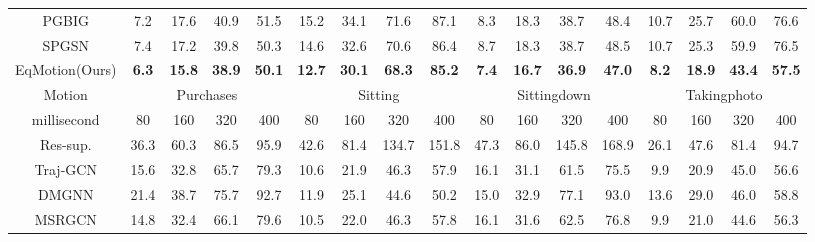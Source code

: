 \documentclass[10pt,twocolumn,letterpaper]{article}
\begin{document}
\begin{table*}[t]
{\begin{tabular}{c|cccc|cccc|cccc|cccc}
PGBIG                &   {7.2}  &   {17.6} &   {40.9} &   {51.5} &   {15.2} &   {34.1} &   {71.6} &   {87.1} &   {8.3}  &   {18.3} &   {38.7} &   {48.4} &   {10.7} &   {25.7} &   {60.0} &   {76.6} \\ 
SPGSN               & 7.4          & 17.2          & 39.8          & 50.3          & 14.6         & 32.6          & {70.6}         & {86.4}         & 8.7 &18.3& 38.7& 48.5        & 10.7& 25.3& 59.9& 76.5               \\ 
EqMotion(Ours) & \textbf{6.3}&\textbf{15.8}&\textbf{38.9}&\textbf{50.1}&\textbf{12.7}&\textbf{30.1}&\textbf{68.3}&\textbf{85.2}&\textbf{7.4}&\textbf{16.7}&\textbf{36.9}&\textbf{47.0}&\textbf{8.2}&\textbf{18.9}&\textbf{43.4}&\textbf{57.5} \\ \hline
Motion           & \multicolumn{4}{c|}{Purchases}                                 & \multicolumn{4}{c|}{Sitting}                                   & \multicolumn{4}{c|}{Sittingdown}                               & \multicolumn{4}{c}{Takingphoto}                               \\ \hline
millisecond        & 80           & 160          & 320          & 400          & 80           & 160          & 320          & 400          & 80           & 160          & 320          & 400          & 80           & 160          & 320          & 400          \\ \hline
Res-sup.          & 36.3          & 60.3          & 86.5          & 95.9          & 42.6          & 81.4          & 134.7         & 151.8         & 47.3          & 86.0          & 145.8         & 168.9         & 26.1          & 47.6          & 81.4          & 94.7          \\
Traj-GCN                & 15.6          & 32.8          & 65.7          &  79.3          & 10.6          &  21.9          & 46.3          & 57.9          & 16.1          &  31.1          &  61.5          &  75.5          & 9.9           &  20.9          & 45.0          & 56.6          \\
DMGNN              & 21.4          & 38.7          & 75.7          & 92.7          & 11.9          & 25.1          & 44.6          &   {50.2}          & 15.0          & 32.9          & 77.1          & 93.0          & 13.6          & 29.0          & 46.0          & 58.8          \\
MSRGCN                &  14.8          &  32.4          & 66.1          & 79.6          &  10.5          & 22.0          &  46.3          & 57.8          &  16.1          & 31.6          & 62.5          & 76.8          &  9.9           & 21.0          &  44.6          &  56.3         \\

\end{tabular}}
\end{table*}
\end{document}
